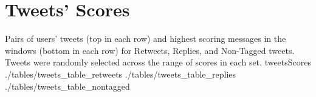 \chapter{Tweets' Scores}
\tweetTableFull
{Pairs of users' tweets (top in each row) and highest scoring messages in the windows (bottom in each row) for Retweets, Replies, and Non-Tagged tweets.  Tweets were randomly selected across the range of scores in each set.}
{tweetsScores}
{./tables/tweets_table_retweets}
{./tables/tweets_table_replies}
{./tables/tweets_table_nontagged}
